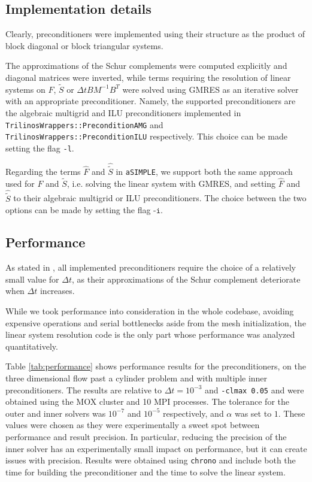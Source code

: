 \subsection{Implementation details}
Clearly, preconditioners were implemented using their structure as the product of block diagonal or block triangular systems. 

The approximations of the Schur complements were computed explicitly and diagonal matrices were inverted, while terms requiring the resolution of linear systems on $F$, $\tilde{S}$ or $\Delta t B M^{-1} B^T$ were solved using GMRES as an iterative solver with an appropriate preconditioner. Namely, the supported preconditioners are the algebraic multigrid and ILU preconditioners implemented in \texttt{Trilinos\-Wrappers::\-PreconditionAMG} and \texttt{Trilinos\-Wrappers::\-PreconditionILU} respectively. This choice can be made setting the flag \texttt{-l}.

Regarding the terms $\hat{F}$ and $\hat{\tilde{S}}$ in \texttt{aSIMPLE}, we support both the same approach used for $F$ and $\tilde{S}$, i.e. solving the linear system with GMRES, and setting $\hat{F}$ and $\hat{\tilde{S}}$ to their algebraic multigrid or ILU preconditioners. The choice between the two options can be made by setting the flag $\texttt{-i}$.

\subsection{Performance}
As stated in \cite{Quarteroni}, all implemented preconditioners require the choice of a relatively small value for $\Delta t$, as their approximations of the Schur complement deteriorate when $\Delta t$ increases.

While we took performance into consideration in the whole codebase, avoiding expensive operations and serial bottlenecks aside from the mesh initialization, the linear system resolution code is the only part whose performance was analyzed quantitatively.

Table \ref{tab:performance} shows performance results for the preconditioners, on the three dimensional flow past a cylinder problem and with multiple inner preconditioners. The results are relative to $\Delta t = 10^{-3}$ and \texttt{-clmax 0.05} and were obtained using the MOX cluster and 10 MPI processes. The tolerance for the outer and inner solvers was $10^{-7}$ and $10^{-5}$ respectively, and $\alpha$ was set to $1$. These values were chosen as they were experimentally a sweet spot between performance and result precision. In particular, reducing the precision of the inner solver has an experimentally small impact on performance, but it can create issues with precision. Results were obtained using \texttt{chrono} and include both the time for building the preconditioner and the time to solve the linear system.

